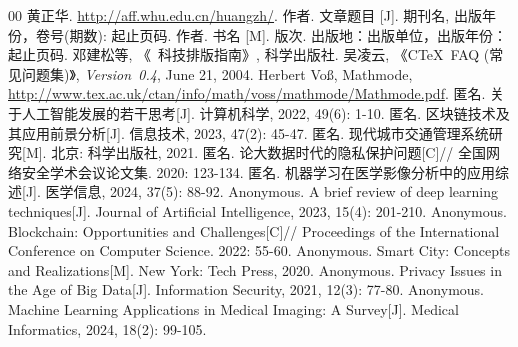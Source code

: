 \documentclass[class = academic, type=thesis, AutoFakeBold=3.17, AutoFakeSlant=0.2]{gdufe_master}
\begin{document}
\newclearpage
{}
\appendix
\begin{thebibliography}{00}
    黄正华. \url{http://aff.whu.edu.cn/huangzh/}.\the\baselineskip
     作者. 文章题目 [J].  期刊名, 出版年份，卷号(期数): 起止页码.\the\baselineskip
     作者. 书名 [M]. 版次. 出版地：出版单位，出版年份：起止页码.
     邓建松等, 《\LaTeXe~科技排版指南》, 科学出版社.
     吴凌云, 《CTeX~FAQ (常见问题集)》, \textit{Version~0.4}, June 21, 2004.
     Herbert Vo\ss, Mathmode, \url{http://www.tex.ac.uk/ctan/info/math/voss/mathmode/Mathmode.pdf}.
     匿名. 关于人工智能发展的若干思考[J]. 计算机科学, 2022, 49(6): 1-10.
     匿名. 区块链技术及其应用前景分析[J]. 信息技术, 2023, 47(2): 45-47.
     匿名. 现代城市交通管理系统研究[M]. 北京: 科学出版社, 2021.
     匿名. 论大数据时代的隐私保护问题[C]// 全国网络安全学术会议论文集. 2020: 123-134.
     匿名. 机器学习在医学影像分析中的应用综述[J]. 医学信息, 2024, 37(5): 88-92.
     Anonymous. A brief review of deep learning techniques[J]. Journal of Artificial Intelligence, 2023, 15(4): 201-210.
     Anonymous. Blockchain: Opportunities and Challenges[C]// Proceedings of the International Conference on Computer Science. 2022: 55-60.
     Anonymous. Smart City: Concepts and Realizations[M]. New York: Tech Press, 2020.
     Anonymous. Privacy Issues in the Age of Big Data[J]. Information Security, 2021, 12(3): 77-80.
     Anonymous. Machine Learning Applications in Medical Imaging: A Survey[J]. Medical Informatics, 2024, 18(2): 99-105.
\end{thebibliography}

\printbibliography[heading=bibintoc, title={参考文献--bib}]



\end{document}
